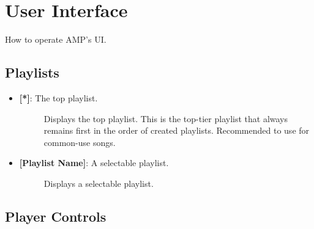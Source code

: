 \documentclass{article}
\begin{document}
\clearpage

\section{User Interface}
\quad How to operate AMP's UI.

\subsection{Playlists}

\begin{itemize}
    \item \textbf{[*]}: The top playlist.
    \begin{description}
        \item[] Displays the top playlist. This is the top-tier playlist that always remains first in the order of created playlists. Recommended to use for common-use songs.
    \end{description}
    \item \textbf{[Playlist Name]}: A selectable playlist.
    \begin{description}
        \item[] Displays a selectable playlist.
    \end{description}
\end{itemize}

\subsection{Player Controls}
\end{document}
